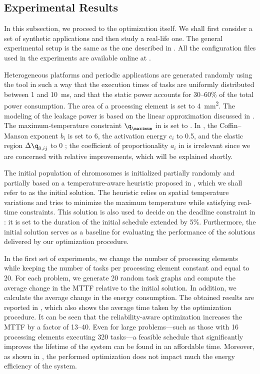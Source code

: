 \subsection{Experimental Results}

In this subsection, we proceed to the optimization itself. We shall first
consider a set of synthetic applications and then study a real-life one. The
general experimental setup is the same as the one described in
. All the configuration files used in the
experiments are available online at \cite{eslab2012}.

Heterogeneous platforms and periodic applications are generated randomly using
the  tool \cite{dick1998} in such a way that the execution times of
tasks are uniformly distributed between 1 and 10~ms, and that the static power
accounts for 30--60\% of the total power consumption. The area of a processing
element is set to 4~mm\textsuperscript{2}. The modeling of the leakage power is
based on the linear approximation discussed in
. The maximum-temperature constraint
$\q_\maximum$ in  is set to . In
, the Coffin--Manson exponent $b_i$ is set to
6, the activation energy $c_i$ to 0.5, and the elastic region $\Delta \q_{0,
ij}$ to 0 \cite{jedec2016}; the coefficient of proportionality $a_i$ in
 is irrelevant since we are concerned with
relative improvements, which will be explained shortly.

The initial population of chromosomes is initialized partially randomly and
partially based on a temperature-aware heuristic proposed in \cite{xie2006},
which we shall refer to as the initial solution. The heuristic relies on spatial
temperature variations and tries to minimize the maximum temperature while
satisfying real-time constraints. This solution is also used to decide on the
deadline constraint \period in : it is set to
the duration of the initial schedule extended by 5\%. Furthermore, the initial
solution serves as a baseline for evaluating the performance of the solutions
delivered by our optimization procedure.

In the first set of experiments, we change the number of processing elements \np
while keeping the number of tasks \nt per processing element constant and equal
to 20. For each problem, we generate 20 random task graphs and compute the
average change in the \ac{MTTF} relative to the initial solution. In addition,
we calculate the average change in the energy consumption. The obtained results
are reported in , which also shows the average
time taken by the optimization procedure. It can be seen that the
reliability-aware optimization increases the \ac{MTTF} by a factor of 13--40.
Even for large problems---such as those with 16 processing elements executing
320 tasks---a feasible schedule that significantly improves the lifetime of the
system can be found in an affordable time. Moreover, as shown in
, the performed optimization does not impact much
the energy efficiency of the system.

